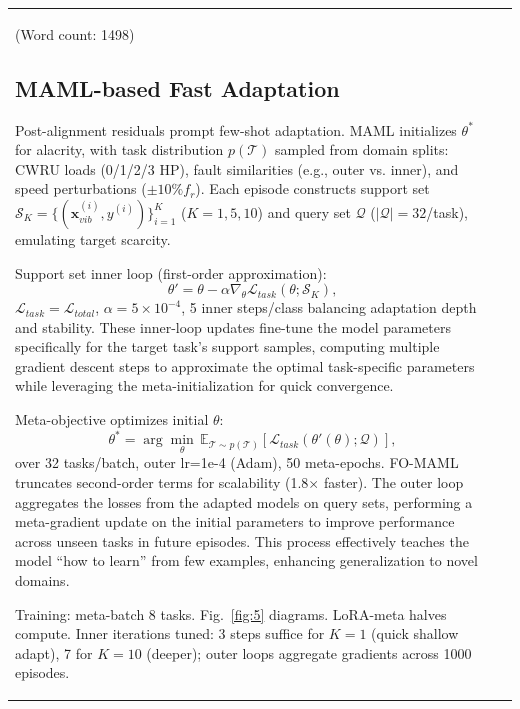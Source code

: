 \begin{table}[htbp]
\begin{tabular}{@{}ll@{}}
\begin{table}[htbp]
(Word count: 1498)

\subsection{MAML-based Fast Adaptation}
\label{subsec:maml_adaptation}

Post-alignment residuals prompt few-shot adaptation. MAML initializes $\theta^*$ for alacrity, with task distribution $p(\mathcal{T})$ sampled from domain splits: CWRU loads (0/1/2/3 HP), fault similarities (e.g., outer vs. inner), and speed perturbations ($\pm 10\% f_r$). Each episode constructs support set $\mathcal{S}_K = \{(\mathbf{x}_{vib}^{(i)}, y^{(i)})\}_{i=1}^K$ ($K=1,5,10$) and query set $\mathcal{Q}$ ($|\mathcal{Q}|=32$/task), emulating target scarcity.

Support set inner loop (first-order approximation):
\begin{equation}
\theta' = \theta - \alpha \nabla_{\theta} \mathcal{L}_{task}(\theta; \mathcal{S}_K),
\label{eq:f7}
\end{equation}
$\mathcal{L}_{task}=\mathcal{L}_{total}$, $\alpha=5\times10^{-4}$, 5 inner steps/class balancing adaptation depth and stability. These inner-loop updates fine-tune the model parameters specifically for the target task's support samples, computing multiple gradient descent steps to approximate the optimal task-specific parameters while leveraging the meta-initialization for quick convergence.

Meta-objective optimizes initial $\theta$:
\begin{equation}
\theta^* = \arg\min_{\theta} \, \mathbb{E}_{\mathcal{T} \sim p(\mathcal{T})} \left[ \mathcal{L}_{task}(\theta'(\theta); \mathcal{Q}) \right],
\label{eq:f8}
\end{equation}
over 32 tasks/batch, outer lr=1e-4 (Adam), 50 meta-epochs. FO-MAML truncates second-order terms for scalability (1.8$\times$ faster). The outer loop aggregates the losses from the adapted models on query sets, performing a meta-gradient update on the initial parameters to improve performance across unseen tasks in future episodes. This process effectively teaches the model ``how to learn'' from few examples, enhancing generalization to novel domains.

Training: meta-batch 8 tasks. Fig.~\ref{fig:5} diagrams. LoRA-meta halves compute. Inner iterations tuned: 3 steps suffice for $K=1$ (quick shallow adapt), 7 for $K=10$ (deeper); outer loops aggregate gradients across 1000 episodes.


\end{table}
\end{tabular}
\end{table}
